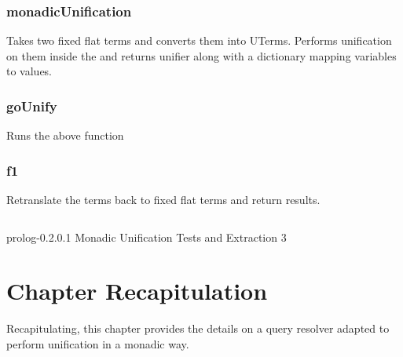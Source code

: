 \documentclass[thesis-solanki.tex]{subfiles}
\begin{document}
\subsubsection{monadicUnification}
Takes two fixed flat terms and converts them into UTerms. Performs unification on them inside the  and 
returns unifier along with a dictionary mapping variables to values. 

\subsubsection{goUnify}
Runs the above function 


\subsubsection{f1}

Retranslate the terms back to fixed flat terms and return results. 


\begin{code-list}[H]
  \begin{singlespace}
    \inputminted[linenos,firstline=96]{haskell}{haskell-proto2-monadic-unification-tests-and-extraction.hs}
  \end{singlespace}
\caption{prolog-0.2.0.1 Monadic Unification Tests and Extraction 3}
\label{tab:prlg0201monadicunificationtestsandextraction3}
\end{code-list}



\section{Chapter Recapitulation}
Recapitulating, this chapter provides the details on a  query resolver adapted to perform unification in a monadic way. 


\ifMain
\begin{scope}
  \nolinenumbers
  \enotesize
  \par
  \begin{singlespace}
  \setlength{\parskip}{12pt plus 2pt minus 1pt}
  \theendnotes
  \par
  \end{singlespace}
\end{scope}
\fi
\end{document}
